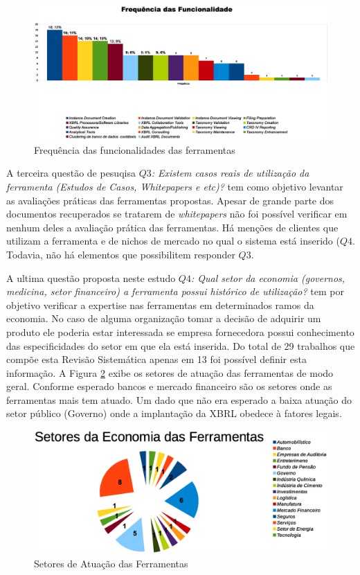 \documentclass[12pt]{article}
\begin{document}
\begin{figure}[htb]
\centering
\includegraphics[width=\textwidth]{../img/graph_funcionalidades.eps}
\caption{Frequência das funcionalidades das ferramentas}
\label{fig:funcionalidades}
\end{figure}

A terceira questão de pesuqisa \textit{$Q3$: Existem casos reais de utilização da ferramenta
    (Estudos de Casos, Whitepapers e etc)?} tem como objetivo levantar as
  avaliações práticas das ferramentas propostas. Apesar de grande parte dos
  documentos recuperados se tratarem de \textit{whitepapers} não foi possível
  verificar em nenhum deles a avaliação prática das ferramentas. Há menções de
  clientes  que utilizam a ferramenta e de nichos de mercado no qual o sistema
  está inserido (\textit{$Q4$}. Todavia, não há elementos que possibilitem
  responder \textit{$Q3$}.

A ultima questão proposta neste estudo \textit{$Q4$: Qual setor da economia
  (governos, medicina, setor financeiro) a ferramenta possui histórico de
  utilização?} tem por objetivo verificar a expertise nas ferramentas em
determinados ramos da economia. No caso de alguma organização tomar a decisão
de adquirir um produto ele poderia estar interessada se empresa fornecedora
possui conhecimento das especificidades do setor em que ela está inserida. Do
total de 29 trabalhos que compõe esta Revisão Sistemática apenas em 13 foi
possível definir esta informação. A Figura \ref{fig:setores} exibe os setores
de atuação das ferramentas de modo geral. Conforme esperado bancos e mercado
financeiro são os setores onde as ferramentas mais tem atuado. Um dado que não
era esperado a baixa atuação do setor público (Governo) onde a implantação da
XBRL obedece à fatores legais.

\begin{figure}[htb]
\centering
\includegraphics[width=.95\textwidth]{../img/graph_setores.eps}
\caption{Setores de Atuação das Ferramentas}
\label{fig:setores}
\end{figure}
\end{document}
